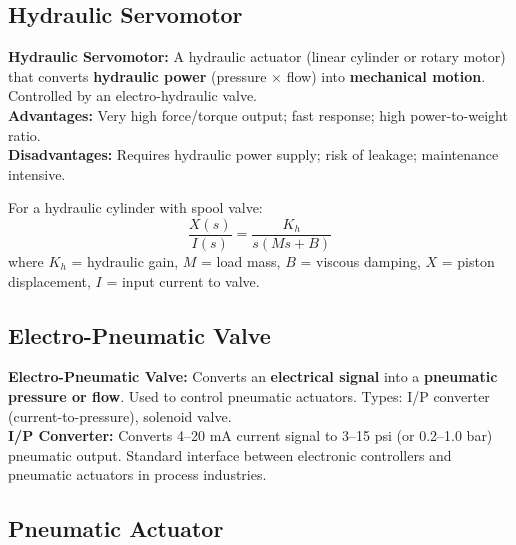\documentclass[12pt,a4paper]{article}
\begin{document}
\subsection{Hydraulic Servomotor}

\begin{tcolorbox}[defbox]
\textbf{Hydraulic Servomotor:} A hydraulic actuator (linear cylinder or rotary motor) that converts \textbf{hydraulic power} (pressure $\times$ flow) into \textbf{mechanical motion}. Controlled by an electro-hydraulic valve.\\[4pt]
\textbf{Advantages:} Very high force/torque output; fast response; high power-to-weight ratio.\\
\textbf{Disadvantages:} Requires hydraulic power supply; risk of leakage; maintenance intensive.
\end{tcolorbox}

\begin{tcolorbox}[formulabox, title={Hydraulic Actuator Transfer Function}]
For a hydraulic cylinder with spool valve:
$$\frac{X(s)}{I(s)} = \frac{K_h}{s(Ms + B)}$$
where $K_h$ = hydraulic gain, $M$ = load mass, $B$ = viscous damping, $X$ = piston displacement, $I$ = input current to valve.
\end{tcolorbox}

\subsection{Electro-Pneumatic Valve}

\begin{tcolorbox}[defbox]
\textbf{Electro-Pneumatic Valve:} Converts an \textbf{electrical signal} into a \textbf{pneumatic pressure or flow}. Used to control pneumatic actuators. Types: I/P converter (current-to-pressure), solenoid valve.\\[4pt]
\textbf{I/P Converter:} Converts 4--20 mA current signal to 3--15 psi (or 0.2--1.0 bar) pneumatic output. Standard interface between electronic controllers and pneumatic actuators in process industries.
\end{tcolorbox}

\subsection{Pneumatic Actuator}
\end{document}
